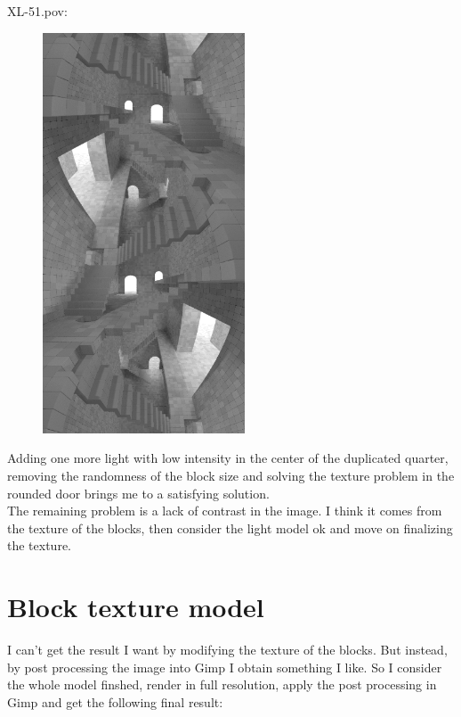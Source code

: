 \documentclass[12pt, a4paper]{article}
\begin{document}
XL-51.pov:\\
\begin{scriptsize}
\begin{ttfamily}

\end{ttfamily}
\end{scriptsize}

\begin{center}
\begin{figure}[H]
\centering
\includegraphics[width=6cm]{./XL-51_15.png}\\
\end{figure}
\end{center}

Adding one more light with low intensity in the center of the duplicated quarter, removing the randomness of the block size and solving the texture problem in the rounded door brings me to a satisfying solution.\\

The remaining problem is a lack of contrast in the image. I think it comes from the texture of the blocks, then consider the light model ok and move on finalizing the texture.\\

\section{Block texture model}

I can't get the result I want by modifying the texture of the blocks. But instead, by post processing the image into Gimp I obtain something I like. So I consider the whole model finshed, render in full resolution, apply the post processing in Gimp and get the following final result:\\
\end{document}
